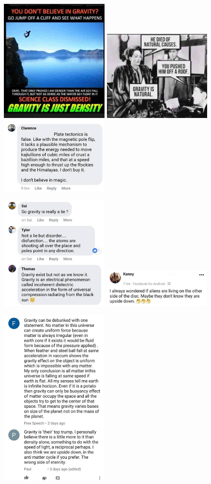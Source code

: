 \includegraphics[width=5.5cm]{images/gravity_stupid/stupid4}
\includegraphics[width=5.5cm]{images/gravity_stupid/stupid5}
\includegraphics[width=5.5cm]{images/gravity_stupid/stupid6}

\includegraphics[width=5.5cm]{images/gravity_stupid/stupid7}
\includegraphics[width=5.5cm]{images/gravity_stupid/stupid8}

\includegraphics[width=5.5cm]{images/gravity_stupid/stupid9}
